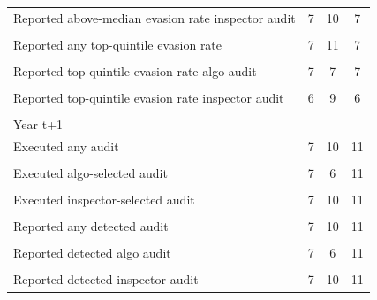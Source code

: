 {\begin{tabular}{l*{3}{c}}
Reported above-median evasion rate inspector audit&           7         &          10         &           7         \\
            &                     &                     &                     \\
Reported any top-quintile evasion rate&           7         &          11         &           7         \\
            &                     &                     &                     \\
Reported top-quintile  evasion rate algo audit&           7         &           7         &           7         \\
            &                     &                     &                     \\
Reported top-quintile  evasion rate  inspector audit&           6         &           9         &           6         \\
            &                     &                     &                     \\
Year t+1    &                     &                     &                     \\
Executed any audit&           7         &          10         &          11         \\
            &                     &                     &                     \\
Executed algo-selected audit&           7         &           6         &          11         \\
            &                     &                     &                     \\
Executed inspector-selected audit&           7         &          10         &          11         \\
            &                     &                     &                     \\
Reported any detected audit&           7         &          10         &          11         \\
            &                     &                     &                     \\
Reported detected algo audit&           7         &           6         &          11         \\
            &                     &                     &                     \\
Reported detected inspector audit&           7         &          10         &          11         \\

\end{tabular}}
